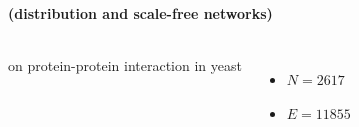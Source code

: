 \documentclass[8pt]{beamer}
\begin{document}
\begin{frame}
\begin{columns}[c]
\end{columns}


\begin{columns}[t]





\end{columns}
 
\end{frame}


\begin{frame}[fragile]
\frametitle{\insertsection}
\framesubtitle{\insertsubsection \hspace{0.05cm} (distribution and scale-free networks)}

\begin{columns}[c]

\begin{minipage}[c][.5\textheight][c]{\linewidth}


{\color{blue}{Yeast data}} on protein-protein interaction in yeast
\begin{itemize}
\item $N = 2617$
\item $E = 11855$
\end{itemize}

\medskip
\medskip



\end{minipage}	   



\end{columns}
\end{frame}
\end{document}

